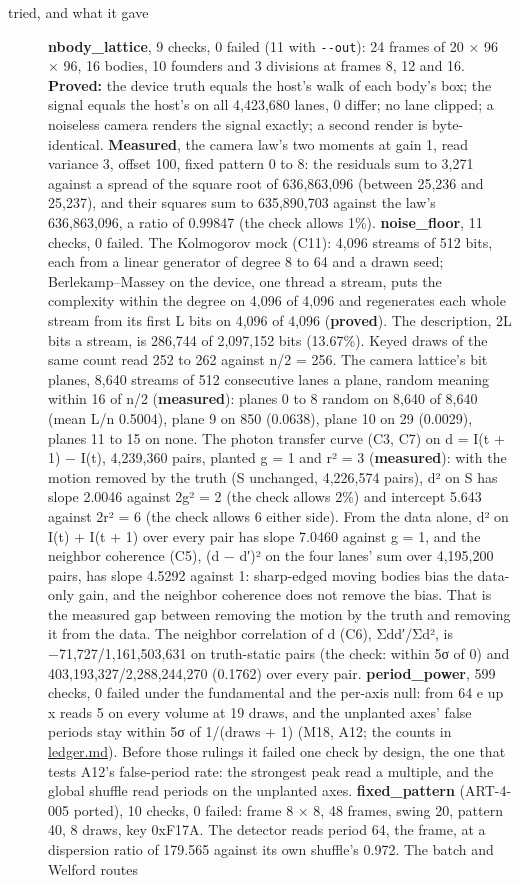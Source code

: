 \begin{description}
\item[{tried, and what it gave}] \textbf{nbody\_\allowbreak{}lattice}, 9 checks, 0 failed (11 with \texttt{-\allowbreak{}-\allowbreak{}out}): 24 frames of 20 × 96 × 96, 16 bodies, 10 founders and 3 divisions at frames 8, 12 and 16. \textbf{Proved:} the device truth equals the host's walk of each body's box; the signal equals the host's on all 4,423,680 lanes, 0 differ; no lane clipped; a noiseless camera renders the signal exactly; a second render is byte-identical. \textbf{Measured}, the camera law's two moments at gain 1, read variance 3, offset 100, fixed pattern 0 to 8: the residuals sum to 3,271 against a spread of the square root of 636,863,096 (between 25,236 and 25,237), and their squares sum to 635,890,703 against the law's 636,863,096, a ratio of 0.99847 (the check allows 1\%). \textbf{noise\_\allowbreak{}floor}, 11 checks, 0 failed. The Kolmogorov mock (C11): 4,096 streams of 512 bits, each from a linear generator of degree 8 to 64 and a drawn seed; Berlekamp–Massey on the device, one thread a stream, puts the complexity within the degree on 4,096 of 4,096 and regenerates each whole stream from its first L bits on 4,096 of 4,096 (\textbf{proved}). The description, 2L bits a stream, is 286,744 of 2,097,152 bits (13.67\%). Keyed draws of the same count read 252 to 262 against n/2 = 256. The camera lattice's bit planes, 8,640 streams of 512 consecutive lanes a plane, random meaning within 16 of n/2 (\textbf{measured}): planes 0 to 8 random on 8,640 of 8,640 (mean L/n 0.5004), plane 9 on 850 (0.0638), plane 10 on 29 (0.0029), planes 11 to 15 on none. The photon transfer curve (C3, C7) on d = I(t + 1) − I(t), 4,239,360 pairs, planted g = 1 and r² = 3 (\textbf{measured}): with the motion removed by the truth (S unchanged, 4,226,574 pairs), d² on S has slope 2.0046 against 2g² = 2 (the check allows 2\%) and intercept 5.643 against 2r² = 6 (the check allows 6 either side). From the data alone, d² on I(t) + I(t + 1) over every pair has slope 7.0460 against g = 1, and the neighbor coherence (C5), (d − d′)² on the four lanes' sum over 4,195,200 pairs, has slope 4.5292 against 1: sharp-edged moving bodies bias the data-only gain, and the neighbor coherence does not remove the bias. That is the measured gap between removing the motion by the truth and removing it from the data. The neighbor correlation of d (C6), Σdd′/Σd², is −71,727/1,161,503,631 on truth-static pairs (the check: within 5σ of 0) and 403,193,327/2,288,244,270 (0.1762) over every pair. \textbf{period\_\allowbreak{}power}, 599 checks, 0 failed under the fundamental and the per-axis null: from 64 e up x reads 5 on every volume at 19 draws, and the unplanted axes' false periods stay within 5σ of 1/(draws + 1) (M18, A12; the counts in \hyperref[chap:ledger]{ledger.md}). Before those rulings it failed one check by design, the one that tests A12's false-period rate: the strongest peak read a multiple, and the global shuffle read periods on the unplanted axes. \textbf{fixed\_\allowbreak{}pattern} (ART-4-005 ported), 10 checks, 0 failed: frame 8 × 8, 48 frames, swing 20, pattern 40, 8 draws, key 0xF17A. The detector reads period 64, the frame, at a dispersion ratio of 179.565 against its own shuffle's 0.972. The batch and Welford routes 
\end{description}
